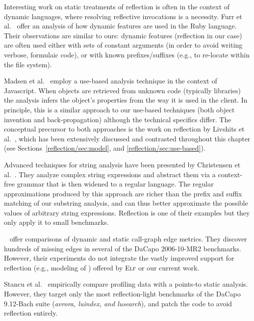 Interesting work on static treatments of reflection is often in the
context of dynamic languages, where resolving reflective invocations
is a necessity.  Furr et al.~\cite{oopsla/FurrAF09} offer an analysis
of how dynamic features are used in the Ruby language. Their
observations are similar to ours: dynamic features (reflection in our
case) are often used either with sets of constant arguments (in order
to avoid writing verbose, formulaic code), or with known
prefixes/suffixes (e.g., to re-locate within the file system).

Madsen et al.~\cite{sigsoft/MadsenLF13} employ a use-based analysis
technique in the context of Javascript. When objects are retrieved
from unknown code (typically libraries) the analysis infers the
object's properties from the way it is used in the client. In
principle, this is a similar approach to our use-based techniques
(both object invention and back-propagation) although the technical
specifics differ. The conceptual precursor to both approaches is the
work on reflection by Livshits et
al.~\cite{aplas/LivshitsWL05,livshits:thesis}, which has been
extensively discussed and contrasted throughout this chapter (see
Sections~\ref{reflection/sec:model}, and \ref{reflection/sec:use-based}).

Advanced techniques for string analysis have been presented by
Christensen et al.~\cite{sas/ChristensenMS03}. They analyze complex
string expressions and abstract them via a context-free grammar that
is then widened to a regular language. The regular approximations
produced by this approach are richer than the prefix and suffix
matching of our substring analysis, and can thus better approximate
the possible values of arbitrary string expressions. Reflection is one
of their examples but they only apply it to small benchmarks.

\citeauthor{ecoop/AliL12}~\cite{ecoop/AliL12,ecoop/AliL13} offer
comparisons of dynamic and static call-graph edge metrics.  They
discover hundreds of missing edges in several of the DaCapo
2006-10-MR2 benchmarks.  However, their experiments do not integrate
the vastly improved support for reflection (e.g., modeling of
) offered by \textsc{Elf} or our
current work.

Stancu et al.~\cite{pppj/StancuWBLF14} empirically
compare profiling data with a points-to static analysis.
However, they target only the most reflection-light benchmarks of the
DaCapo 9.12-Bach suite (\emph{avrora, luindex, and lusearch}), and
patch the code to avoid reflection entirely.

